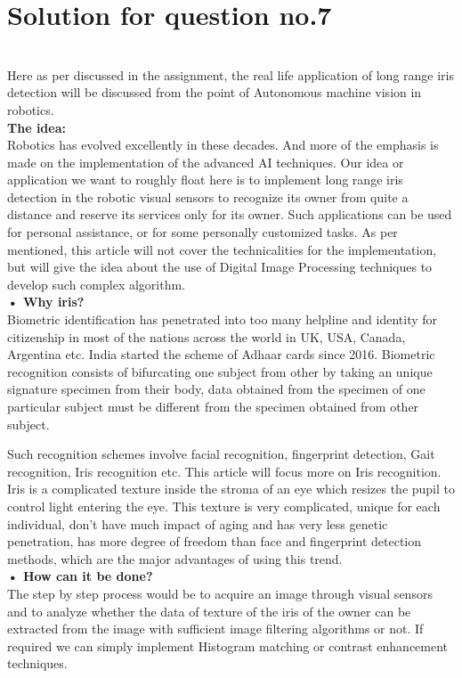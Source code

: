 \documentclass{report}
\begin{document}
 
\newpage

\noindent \section{Solution for question no.7}\\

\noindent Here as per discussed in the assignment, the real life application of long range iris detection will be discussed from the point of Autonomous machine vision in robotics.\\

\noindent \textbf{The idea:}\\
\noindent Robotics has evolved excellently in these decades. And more of the emphasis is made on the implementation of the advanced AI techniques. Our idea or application we want to roughly float here is to implement long range iris detection in the robotic visual sensors to recognize its owner from quite a distance and reserve its services only for its owner.
Such applications can be used for personal assistance, or for some personally customized tasks. As per mentioned, this article will not cover the technicalities for the implementation, but will give the idea about the use of Digital Image Processing techniques to develop such complex algorithm.\\
\noindent \textbf{•	Why iris?}\\ 
\noindent Biometric identification has penetrated into too many helpline and identity for citizenship in most of the nations across the world in UK, USA, Canada, Argentina etc. India started the scheme of Adhaar cards since 2016. Biometric recognition consists of bifurcating one subject from other by taking an unique signature specimen from their body, data obtained from the specimen of one particular subject must be different from the specimen obtained from other subject. 

Such recognition schemes involve facial recognition, fingerprint detection, Gait recognition, Iris recognition etc. This article will focus more on Iris recognition. Iris is a complicated texture inside the stroma of an eye which resizes the pupil to control light entering the eye. This texture is very complicated, unique for each individual, don’t have much impact of aging  and has very less genetic penetration, has more degree of freedom than face and fingerprint detection methods, which are the major advantages of using this trend. \\


\noindent \textbf{•	How can it be done?}\\
\noindent The step by step process would be to acquire an image through visual sensors and to analyze whether the data of texture of the iris of the owner can be extracted from the image with sufficient image filtering algorithms or not. If required we can simply implement Histogram matching or contrast enhancement techniques.\\
\end{document}
